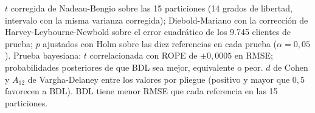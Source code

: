 \begin{table}[tbp]
\begin{tabular}{lcccccccc}
    \bottomrule
  \end{tabular}
  \par\smallskip\begin{minipage}{0.97\linewidth}\scriptsize $t$ corregida de Nadeau-Bengio sobre las 15 particiones (14 grados de libertad, intervalo con la misma varianza corregida); Diebold-Mariano con la corrección de Harvey-Leybourne-Newbold sobre el error cuadrático de los 9.745 clientes de prueba; $p$ ajustados con Holm sobre las diez referencias en cada prueba ($\alpha=0{,}05$). Prueba bayesiana: $t$ correlacionada con ROPE de $\pm0{,}0005$ en RMSE; probabilidades posteriores de que BDL sea mejor, equivalente o peor. $d$ de Cohen y $A_{12}$ de Vargha-Delaney entre los valores por pliegue (positivo y mayor que $0{,}5$ favorecen a BDL). BDL tiene menor RMSE que cada referencia en las 15 particiones.\end{minipage}
\end{table}

